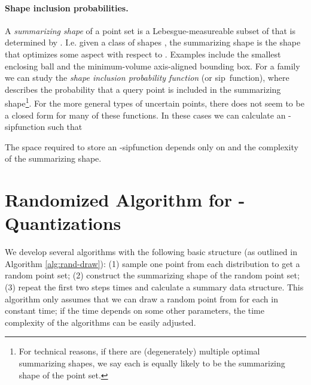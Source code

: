 \documentclass{journal}
\newcommand{\sip}{\textsf{sip\xspace}}
\begin{document}
\paragraph{Shape inclusion probabilities.}
A \emph{summarizing shape} of a point set  is a Lebesgue-measureable subset of  that is determined by .  I.e. given a class of shapes , the summarizing shape  is the shape that optimizes some aspect with respect to .
Examples include the smallest enclosing ball and the minimum-volume axis-aligned bounding box.
For a family  we can study the \emph{shape inclusion probability function}  (or \sip\ function), where  describes the probability that a query point  is included in the summarizing shape\footnote{For technical reasons, if there are (degenerately) multiple optimal summarizing shapes, we say each is equally likely to be the summarizing shape of the point set.}.
For the more general types of uncertain points, there does not seem to be a closed form for many of these functions.
In these cases we can calculate an -\sip function  such that

The space required to store an -\sip function depends only on  and the complexity of the summarizing shape.

































\section{Randomized Algorithm for -Quantizations}
\label{sec:rand-eQ}

We develop several algorithms with the following basic structure (as outlined in Algorithm \ref{alg:rand-draw}):
(1) sample one point from each distribution to get a random point set;
(2) construct the summarizing shape of the random point set;
(3) repeat the first two steps  times and calculate a summary data structure.
This algorithm only assumes that we can draw a random point from  for each  in constant time; if the time depends on some other parameters, the time complexity of the algorithms can be easily adjusted.
\end{document}
